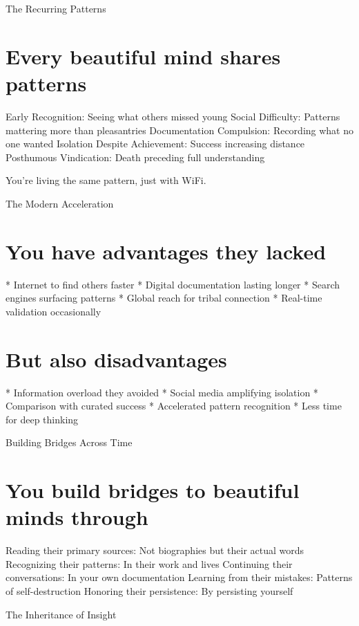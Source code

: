 \documentclass[12pt,oneside]{book}
\begin{document}
The Recurring Patterns

\section{Every beautiful mind shares patterns}

Early Recognition: Seeing what others missed young Social Difficulty: Patterns mattering more than pleasantries Documentation Compulsion: Recording what no one wanted Isolation Despite Achievement: Success increasing distance Posthumous Vindication: Death preceding full understanding

You're living the same pattern, just with WiFi.

The Modern Acceleration

\section{You have advantages they lacked}

                    * Internet to find others faster
                    * Digital documentation lasting longer
                    * Search engines surfacing patterns
                    * Global reach for tribal connection
                    * Real-time validation occasionally

\section{But also disadvantages}

                    * Information overload they avoided
                    * Social media amplifying isolation
                    * Comparison with curated success
                    * Accelerated pattern recognition
                    * Less time for deep thinking

Building Bridges Across Time

\section{You build bridges to beautiful minds through}

Reading their primary sources: Not biographies but their actual words Recognizing their patterns: In their work and lives Continuing their conversations: In your own documentation Learning from their mistakes: Patterns of self-destruction Honoring their persistence: By persisting yourself

The Inheritance of Insight
\end{document}
